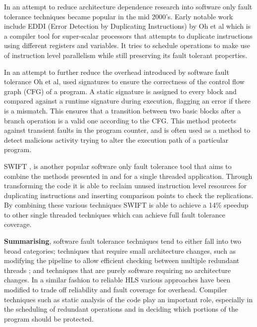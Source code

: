 In an attempt to reduce architecture dependence research into software only fault tolerance techniques became popular in the mid 2000's.
Early notable work include EDDI (Error Detection by Duplicating Instructions) by Oh et al \cite{oh2002error} which is a compiler
tool for super-scalar processors that attempts to duplicate instructions using different registers and variables.
It tries to schedule operations to make use of instruction level parallelism while still preserving its fault tolerant properties.

In an attempt to further reduce the overhead introduced by software fault tolerance Oh et al, \cite{oh2002control} used signatures
to ensure the correctness of the control flow graph (CFG) of a program.
A static signature is assigned to every block and compared against a runtime signature during execution, flagging an error
if there is a mismatch.
This ensures that a transition between two basic blocks after a branch operation is a valid one according to the CFG.
This method protects against transient faults in the program counter, and is often used as a method to detect malicious activity
trying to alter the execution path of a particular program.

SWIFT \cite{reis2005swift}, is another popular software only fault tolerance tool that aims to combine the methods
presented in \cite{oh2002error} and \cite{oh2002control} for a single threaded application.
Through transforming the code it is able to reclaim unused instruction level resources
for duplicating instructions and inserting comparison points to check the replications.
By combining these various techniques SWIFT is able to achieve a 14\% speedup to other single threaded techniques
which can achieve full fault tolerance coverage.

\textbf{Summarising}, software fault tolerance techniques tend to either fall into two broad categories; techniques that
require small architecture changes, such as modifying the pipeline to allow efficient checking between multiple redundant
threads \cite{vijaykumar2002transient}; and techniques that are purely software requiring no architecture changes.
In a similar fashion to reliable HLS various approaches have been modified to trade off reliability and fault coverage
for overhead.
Compiler techniques such as static analysis of the code play an important role, especially in the scheduling of redundant
operations and in deciding which portions of the program should be protected.
